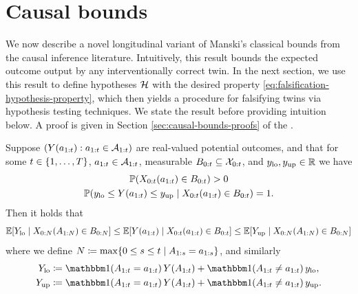%
%
%
%
%
%
%
%
%

%
%
%
%
%
%
%
%


%
%
%
%


%

%

%
%



%



\section{Causal bounds} \label{sec:causal-bounds}

We now describe a novel longitudinal variant of Manski's classical bounds \cite{manski} from the causal inference literature.
Intuitively, this result bounds the expected outcome output by any interventionally correct twin.
In the next section, we use this result to define hypotheses $\mathcal{H}$ with the desired property \eqref{eq:falsification-hypothesis-property}, which then yields a procedure for falsifying twins via hypothesis testing techniques.
%
%
%
%
%
%
%
We state the result before providing intuition below.
A proof is given in Section \ref{sec:causal-bounds-proofs} of the \AppendixName.

\begin{theorem} \label{thm:causal-bounds}
    Suppose $(Y(a_{1:t}) : a_{1:t} \in \mathcal{A}_{1:t})$ are real-valued potential outcomes, and that for some $t \in \{1, \ldots, T\}$, $a_{1:t} \in \mathcal{A}_{1:t}$, measurable $B_{0:t} \subseteq \mathcal{X}_{0:t}$, and $y_{\mathrm{lo}}, y_{\mathrm{up}} \in \mathbb{R}$ we have
%
\noindent
%
%
%
%
%
%
%
%
%
%
%
%
    \begin{gather}
        \mathbb{P}(X_{0:t}(a_{1:t}) \in B_{0:t}) > 0 \label{eq:B-positivity-assumption} \\
        \mathbb{P}(y_{\mathrm{lo}} \leq Y(a_{1:t}) \leq y_{\mathrm{up}} \mid X_{0:t}(a_{1:t}) \in B_{0:t}) = 1.  \label{eq:Y-boundedness-assumption}
    \end{gather}
    \noindent Then it holds that
    \begin{equation} \label{eq:causal-bounds-fully-written}
         \mathbb{E}[Y_{\mathrm{lo}} \mid X_{0:N}(A_{1:N}) \in B_{0:N}]
        \leq \mathbb{E}[Y(a_{1:t}) \mid X_{0:t}(a_{1:t}) \in B_{0:t}]
        \leq  \mathbb{E}[Y_{\mathrm{up}} \mid X_{0:N}(A_{1:N}) \in B_{0:N}] 
    \end{equation}
    where we define $N \coloneqq \max \{0 \leq s \leq t \mid A_{1:s} = a_{1:s}\}$, and similarly
    \begin{align*}
        \Ylo \coloneqq \ind(\A_{1:\tx} &= \ax_{1:\tx}) \, \Y(\A_{1:\tx}) + \ind(\A_{1:\tx} \neq \ax_{1:\tx}) \, \ylo,\\
        \Yup \coloneqq \ind(\A_{1:\tx} &= \ax_{1:\tx}) \, \Y(\A_{1:\tx}) + \ind(\A_{1:\tx} \neq \ax_{1:\tx}) \, \yup.
    \end{align*}

    
\end{theorem}

